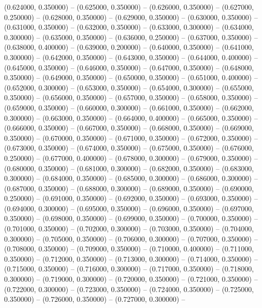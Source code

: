 (0.624000, 0.350000) -- 
(0.625000, 0.350000) -- 
(0.626000, 0.350000) -- 
(0.627000, 0.250000) -- 
(0.628000, 0.350000) -- 
(0.629000, 0.350000) -- 
(0.630000, 0.350000) -- 
(0.631000, 0.350000) -- 
(0.632000, 0.350000) -- 
(0.633000, 0.300000) -- 
(0.634000, 0.300000) -- 
(0.635000, 0.350000) -- 
(0.636000, 0.250000) -- 
(0.637000, 0.350000) -- 
(0.638000, 0.400000) -- 
(0.639000, 0.200000) -- 
(0.640000, 0.350000) -- 
(0.641000, 0.300000) -- 
(0.642000, 0.350000) -- 
(0.643000, 0.350000) -- 
(0.644000, 0.400000) -- 
(0.645000, 0.350000) -- 
(0.646000, 0.350000) -- 
(0.647000, 0.350000) -- 
(0.648000, 0.350000) -- 
(0.649000, 0.350000) -- 
(0.650000, 0.350000) -- 
(0.651000, 0.400000) -- 
(0.652000, 0.300000) -- 
(0.653000, 0.350000) -- 
(0.654000, 0.300000) -- 
(0.655000, 0.350000) -- 
(0.656000, 0.350000) -- 
(0.657000, 0.350000) -- 
(0.658000, 0.350000) -- 
(0.659000, 0.350000) -- 
(0.660000, 0.300000) -- 
(0.661000, 0.350000) -- 
(0.662000, 0.300000) -- 
(0.663000, 0.350000) -- 
(0.664000, 0.400000) -- 
(0.665000, 0.350000) -- 
(0.666000, 0.350000) -- 
(0.667000, 0.350000) -- 
(0.668000, 0.350000) -- 
(0.669000, 0.350000) -- 
(0.670000, 0.350000) -- 
(0.671000, 0.350000) -- 
(0.672000, 0.350000) -- 
(0.673000, 0.350000) -- 
(0.674000, 0.350000) -- 
(0.675000, 0.350000) -- 
(0.676000, 0.250000) -- 
(0.677000, 0.400000) -- 
(0.678000, 0.300000) -- 
(0.679000, 0.350000) -- 
(0.680000, 0.350000) -- 
(0.681000, 0.300000) -- 
(0.682000, 0.350000) -- 
(0.683000, 0.300000) -- 
(0.684000, 0.350000) -- 
(0.685000, 0.300000) -- 
(0.686000, 0.300000) -- 
(0.687000, 0.350000) -- 
(0.688000, 0.300000) -- 
(0.689000, 0.350000) -- 
(0.690000, 0.250000) -- 
(0.691000, 0.350000) -- 
(0.692000, 0.350000) -- 
(0.693000, 0.350000) -- 
(0.694000, 0.300000) -- 
(0.695000, 0.350000) -- 
(0.696000, 0.350000) -- 
(0.697000, 0.350000) -- 
(0.698000, 0.350000) -- 
(0.699000, 0.350000) -- 
(0.700000, 0.350000) -- 
(0.701000, 0.350000) -- 
(0.702000, 0.300000) -- 
(0.703000, 0.350000) -- 
(0.704000, 0.300000) -- 
(0.705000, 0.350000) -- 
(0.706000, 0.300000) -- 
(0.707000, 0.350000) -- 
(0.708000, 0.350000) -- 
(0.709000, 0.350000) -- 
(0.710000, 0.400000) -- 
(0.711000, 0.350000) -- 
(0.712000, 0.350000) -- 
(0.713000, 0.300000) -- 
(0.714000, 0.350000) -- 
(0.715000, 0.350000) -- 
(0.716000, 0.300000) -- 
(0.717000, 0.350000) -- 
(0.718000, 0.300000) -- 
(0.719000, 0.300000) -- 
(0.720000, 0.350000) -- 
(0.721000, 0.350000) -- 
(0.722000, 0.300000) -- 
(0.723000, 0.350000) -- 
(0.724000, 0.350000) -- 
(0.725000, 0.350000) -- 
(0.726000, 0.350000) -- 
(0.727000, 0.300000) -- 
